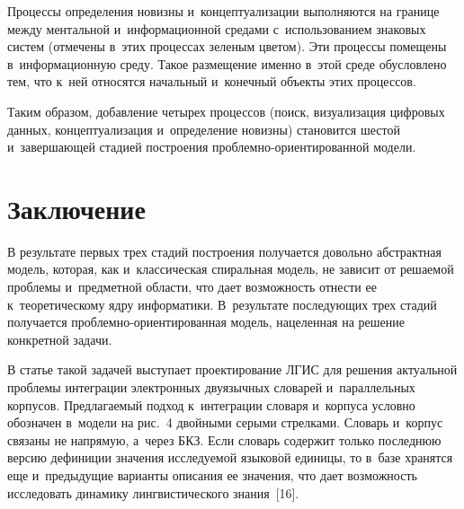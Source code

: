 \begin{multicols}{2}
  Процессы определения новизны и~концептуализации выполняются на 
границе между ментальной и~информационной средами с~использованием 
знаковых сис\-тем (отмечены в~этих процессах зеленым цветом). Эти процессы 
помещены в~информационную среду. Такое размещение именно в~этой среде 
обусловлено тем, что к~ней относятся начальный и~конечный объекты этих 
процессов.
  
  Таким образом, добавление четырех процессов (поиск, визуализация 
цифровых данных, концептуализация и~определение новизны) становится 
шес\-той и~завершающей стадией по\-стро\-ения  
проб\-лем\-но-ори\-ен\-ти\-ро\-ван\-ной модели.

\vspace*{-2pt}
  
\section{Заключение}

\vspace*{-2pt}

  В результате первых трех стадий построения получается довольно 
абстрактная модель, которая, как и~классическая спиральная модель, не зависит 
от решаемой проб\-ле\-мы и~предметной об\-ласти, что дает возможность 
отнести ее к~тео\-ре\-ти\-че\-ско\-му яд\-ру информатики. В~результате 
 по\-сле\-ду\-ющих трех стадий получается  
проб\-лем\-но-ори\-ен\-ти\-ро\-ван\-ная модель, нацеленная на решение 
конкретной задачи.
  
  В статье такой задачей выступает проектирование ЛГИС для решения 
актуальной проб\-ле\-мы интеграции электронных двуязычных словарей 
и~параллельных корпусов. Пред\-ла\-га\-емый подход к~\mbox{интеграции} словаря 
и~корпуса условно обозначен в~модели на рис.~4 двойными серыми стрелками. 
Словарь и~корпус связаны не напрямую, а~через БКЗ. 
Если словарь содержит только по\-след\-нюю версию дефиниции значения 
ис\-сле\-ду\-емой языков$\acute{\mbox{о}}$й единицы, то в~базе хранятся еще 
и~предыду\-щие варианты описания ее значения, что дает воз\-мож\-ность 
исследовать динамику лингвистического знания~[16].
  

\end{multicols}
